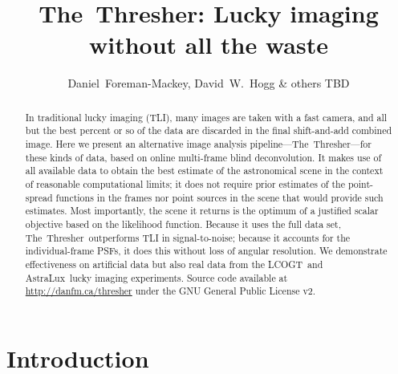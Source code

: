 \documentclass[12pt,preprint]{aastex}
\newcommand{\project}[1]{{\sffamily #1}}
\newcommand{\TheThresher}{\project{The~Thresher}}
\newcommand{\LCOGT}{\project{LCOGT}}
\newcommand{\AstraLux}{\project{AstraLux}}
\newcommand{\license}{GNU General Public License v2}
\begin{document}
\title{\TheThresher: Lucky imaging without all the waste}

\author{%
    Daniel~Foreman-Mackey\altaffilmark{\ref{CCPP},\ref{email}},
    David~W.~Hogg\altaffilmark{\ref{CCPP},\ref{MPIA}}
    \& others TBD
}

\setcounter{address}{1}

\begin{abstract}
    In traditional lucky imaging (TLI), many images are taken with a
    fast camera, and all but the best percent or so of the data are
    discarded in the final shift-and-add combined image.  Here we
    present an alternative image analysis
    pipeline---\TheThresher---for these kinds of data, based on online
    multi-frame blind deconvolution.  It makes use of all available
    data to obtain the best estimate of the astronomical scene in the
    context of reasonable computational limits; it does not require
    prior estimates of the point-spread functions in the frames nor
    point sources in the scene that would provide such estimates.
    Most importantly, the scene it returns is the optimum of a
    justified scalar objective based on the likelihood function.
    Because it uses the full data set, \TheThresher\ outperforms TLI
    in signal-to-noise; because it accounts for the individual-frame
    PSFs, it does this without loss of angular resolution.  We
    demonstrate effectiveness on artificial data but also real data
    from the \LCOGT\ and \AstraLux\ lucky imaging experiments.  Source
    code available at \url{http://danfm.ca/thresher} under the
    \license.
\end{abstract}


\clearpage

\section{Introduction}
\end{document}
